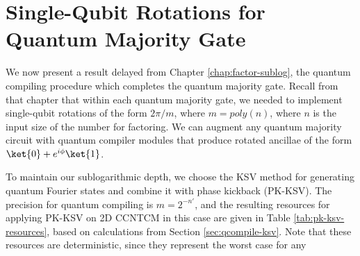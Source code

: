 \section{Single-Qubit Rotations for Quantum Majority Gate}
\label{sec:qcompile-maj}

We now present a result delayed from Chapter \ref{chap:factor-sublog},
the quantum compiling procedure which completes the quantum majority gate.
Recall from that chapter that within each quantum majority gate, we
needed to implement single-qubit rotations of the form
$2\pi / m$, where $m = poly(n)$, where $n$ is the input size of the
number for factoring. We can augment any quantum
majority circuit with quantum compiler modules that produce
rotated ancillae of the form $\ket{0} + e^{i\phi}\ket{1}$.

To maintain our sublogarithmic depth, we choose the KSV method for
generating quantum Fourier states and combine it with phase kickback
(PK-KSV).
The precision for quantum compiling is $m = 2^{-n'}$, and the
resulting resources for applying PK-KSV on \textsf{2D CCNTCM}
in this case are
given in Table \ref{tab:pk-ksv-resources}, based on calculations
from Section \ref{sec:qcompile-ksv}. Note that these resources
are deterministic, since they represent the worst case for any
